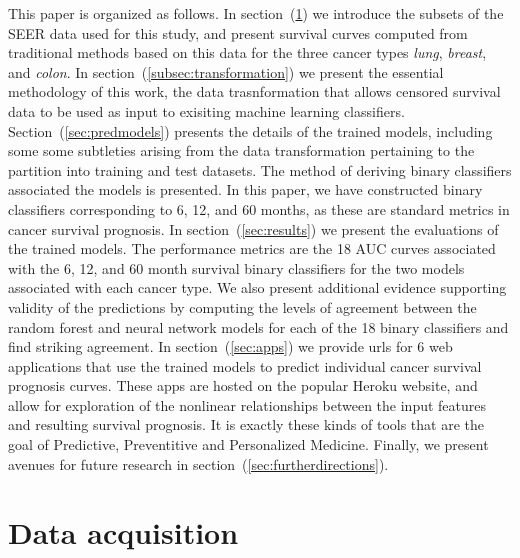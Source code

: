 \documentclass[a4paper,11pt]{article}
\begin{document}
This paper is organized as follows. In section~(\ref{sec:dataacquition}) we introduce the subsets of the SEER data used for this study, and present survival curves computed from traditional methods based on this data for the three cancer types \emph{lung}, \emph{breast}, and \emph{colon}.
In section~(\ref{subsec:transformation}) we present the essential methodology of this work, the data trasnformation that allows censored survival data to be used as input to exisiting machine learning classifiers.  
Section~(\ref{sec:predmodels}) presents the details of the trained models, including some some subtleties arising from the data transformation pertaining to the partition into training and test datasets. The method of deriving binary classifiers associated the models is presented. In this paper, we have constructed binary classifiers corresponding to 6, 12, and 60 months, as these are standard metrics in cancer survival prognosis. 
In section~(\ref{sec:results}) we present the evaluations of the trained models. The performance metrics are the 18 AUC curves associated with the 6, 12, and 60 month survival binary classifiers for the two models associated with each cancer type. We also present additional evidence supporting validity of the predictions by computing the levels of agreement between the random forest and neural network models for each of the 18 binary classifiers and find striking agreement.
In section~(\ref{sec:apps}) we provide urls for 6 web applications that use the trained models to predict individual 
cancer survival prognosis curves. These apps are hosted on the popular Heroku website, and allow for exploration of the nonlinear relationships between the input features and resulting survival prognosis. It is exactly these kinds of tools that are the goal of Predictive, Preventitive and Personalized Medicine. Finally, we present avenues for future research in section~(\ref{sec:furtherdirections}).












\section{Data acquisition}
\label{sec:dataacquition}
\end{document}
